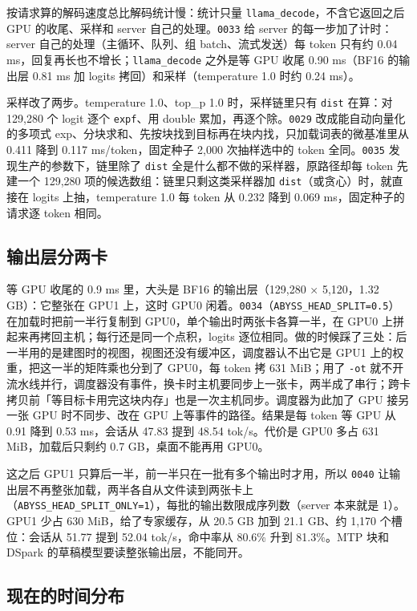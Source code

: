 \documentclass[11pt,a4paper]{article}
\newcommand{\code}[1]{\texttt{#1}}
\newcommand{\tps}{tok/s}
\begin{document}
按请求算的解码速度总比解码统计慢：统计只量 \code{llama\_decode}，不含它返回之后 GPU 的收尾、采样和 server 自己的处理。\code{0033} 给 server 的每一步加了计时：server 自己的处理（主循环、队列、组 batch、流式发送）每 token 只有约 0.04 ms，回复再长也不增长；\code{llama\_decode} 之外是等 GPU 收尾 0.90 ms（BF16 的输出层 0.81 ms 加 logits 拷回）和采样（temperature 1.0 时约 0.24 ms）。

采样改了两步。temperature 1.0、top\_p 1.0 时，采样链里只有 \code{dist} 在算：对 129,280 个 logit 逐个 \code{expf}、用 double 累加，再逐个除。\code{0029} 改成能自动向量化的多项式 exp、分块求和、先按块找到目标再在块内找，只加载词表的微基准里从 0.411 降到 0.117 ms/token，固定种子 2,000 次抽样选中的 token 全同。\code{0035} 发现生产的参数下，链里除了 \code{dist} 全是什么都不做的采样器，原路径却每 token 先建一个 129,280 项的候选数组：链里只剩这类采样器加 \code{dist}（或贪心）时，就直接在 logits 上抽，temperature 1.0 每 token 从 0.232 降到 0.069 ms，固定种子的请求逐 token 相同。

\subsection{输出层分两卡}
\label{sec:headsplit}

等 GPU 收尾的 0.9 ms 里，大头是 BF16 的输出层（129,280 × 5,120，1.32 GB）：它整张在 GPU1 上，这时 GPU0 闲着。\code{0034}（\code{ABYSS\_HEAD\_SPLIT=0.5}）在加载时把前一半行复制到 GPU0，单个输出时两张卡各算一半，在 GPU0 上拼起来再拷回主机；每行还是同一个点积，logits 逐位相同。做的时候踩了三处：后一半用的是建图时的视图，视图还没有缓冲区，调度器认不出它是 GPU1 上的权重，把这一半的矩阵乘也分到了 GPU0，每 token 拷 631 MiB；用了 \code{-ot} 就不开流水线并行，调度器没有事件，换卡时主机要同步上一张卡，两半成了串行；跨卡拷贝前「等目标卡用完这块内存」也是一次主机同步。调度器为此加了 GPU 接另一张 GPU 时不同步、改在 GPU 上等事件的路径。结果是每 token 等 GPU 从 0.91 降到 0.53 ms，会话从 47.83 提到 48.54 \tps{}。代价是 GPU0 多占 631 MiB，加载后只剩约 0.7 GB，桌面不能再用 GPU0。

这之后 GPU1 只算后一半，前一半只在一批有多个输出时才用，所以 \code{0040} 让输出层不再整张加载，两半各自从文件读到两张卡上（\code{ABYSS\_HEAD\_SPLIT\_ONLY=1}），每批的输出数限成序列数（server 本来就是 1）。GPU1 少占 630 MiB，给了专家缓存，从 20.5 GB 加到 21.1 GB、约 1,170 个槽位：会话从 51.77 提到 52.04 \tps{}，命中率从 80.6\% 升到 81.3\%。MTP 块和 DSpark 的草稿模型要读整张输出层，不能同开。

\subsection{现在的时间分布}
\label{sec:nowtime}
\end{document}

